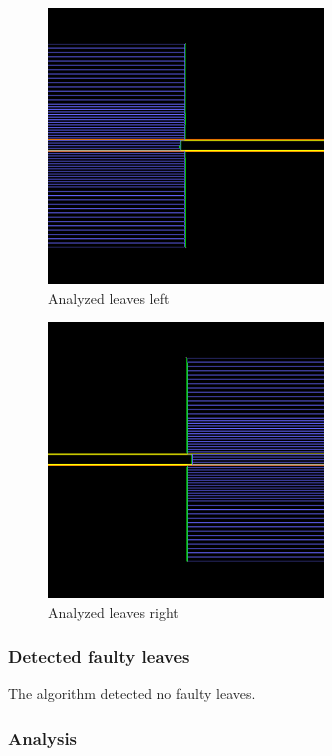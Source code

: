 \begin{figure}[H]
    \centering
    \includegraphics[width=0.65\textwidth]{Content/Images/analysis_la_oncology_left_leaves.png}
    \caption{Analyzed leaves left}
\end{figure}

\begin{figure}[H]
    \centering
    \includegraphics[width=0.65\textwidth]{Content/Images/analysis_la_oncology_right_leaves.png}
    \caption{Analyzed leaves right}
\end{figure}

\subsubsection{Detected faulty leaves}

The algorithm detected no faulty leaves.

\subsubsection{Analysis}

